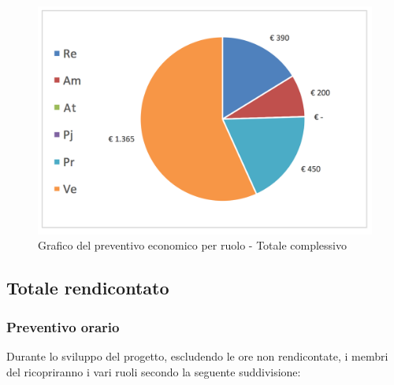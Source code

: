 			\begin{figure}[H]
			\centering
			\includegraphics[scale=0.40]{img/s_Totale}
			\caption{Grafico del preventivo economico per ruolo - Totale complessivo}
			\label{fig:Totale complessivo economico}
			\end{figure}
		\newpage
		\subsection {Totale rendicontato}
				\subsubsection {Preventivo orario}
                Durante lo sviluppo del progetto, escludendo le ore non rendicontate, i membri del  ricopriranno i vari ruoli secondo la seguente suddivisione:\\

